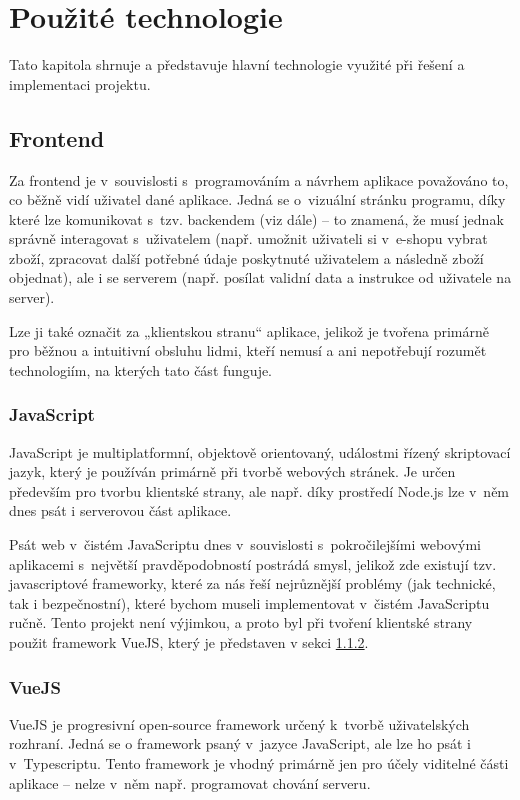 \chapter{Použité technologie}
Tato kapitola shrnuje a představuje hlavní technologie využité při řešení a implementaci projektu.

\section{Frontend}
Za frontend je v~souvislosti s~programováním a návrhem aplikace považováno to, co běžně vidí uživatel dané aplikace. Jedná se o~vizuální stránku programu, díky které lze komunikovat s~tzv. backendem (viz dále) – to znamená, že musí jednak správně interagovat s~uživatelem (např. umožnit uživateli si v~e-shopu vybrat zboží, zpracovat další potřebné údaje poskytnuté uživatelem a následně zboží objednat), ale i se serverem (např. posílat validní data a instrukce od uživatele na server).

Lze ji také označit za „klientskou stranu“ aplikace, jelikož je tvořena primárně pro běžnou a intuitivní obsluhu lidmi, kteří nemusí a ani nepotřebují rozumět technologiím, na kterých tato část funguje. \cite{FEvsBE}

	\subsection{JavaScript}
	JavaScript je multiplatformní, objektově orientovaný, událostmi řízený skriptovací jazyk, který je používán primárně při tvorbě webových stránek. Je určen především pro tvorbu klientské strany, ale např. díky prostředí Node.js lze v~něm dnes psát i serverovou část aplikace. \cite{JS1}\cite{JS2}
	
	Psát web v~čistém JavaScriptu dnes v~souvislosti s~pokročilejšími webovými aplikacemi s~největší pravděpodobností postrádá smysl, jelikož zde existují tzv. javascriptové frameworky, které za nás řeší nejrůznější problémy (jak technické, tak i bezpečnostní), které bychom museli implementovat v~čistém JavaScriptu ručně. Tento projekt není výjimkou, a proto byl při tvoření klientské strany použit framework VueJS, který je představen v sekci \ref{sec:vuejs}.
	
	\subsection{VueJS}\label{sec:vuejs}
	VueJS je progresivní open-source framework určený k~tvorbě uživatelských rozhraní. Jedná se o framework psaný v~jazyce JavaScript, ale lze ho psát i v~Typescriptu. Tento framework je vhodný primárně jen pro účely viditelné části aplikace – nelze v~něm např. programovat chování serveru. \cite{VueJS1}
	
